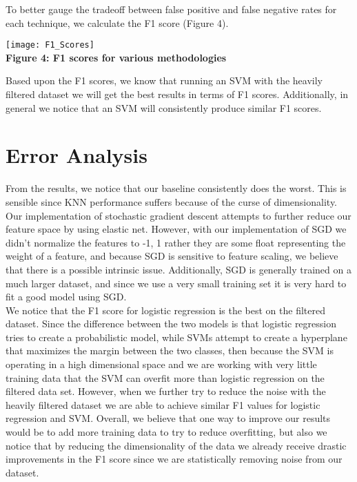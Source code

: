 \documentclass[12pt]{scrartcl}
\begin{document}
    To better gauge the tradeoff between false positive and false negative rates for each technique, we calculate the F1 score (Figure 4).
    
    \begin{center}
    \texttt{[image: F1\_Scores]}\\
    \textbf{Figure 4: F1 scores for various methodologies}
    \end{center}

    Based upon the F1 scores, we know that running an SVM with the heavily filtered dataset we will get the best results in terms of F1 scores. Additionally, in general we notice that an SVM will consistently produce similar F1 scores. 


    \section{Error Analysis}
    From the results, we notice that our baseline consistently does the worst. This is sensible since KNN performance suffers because of the curse of dimensionality. Our implementation of stochastic gradient descent attempts to further reduce our feature space by using elastic net. However, with our implementation of SGD we didn't normalize the features to -1, 1 rather they are some float representing the weight of a feature, and because SGD is sensitive to feature scaling, we believe that there is a possible intrinsic issue. Additionally, SGD is generally trained on a much larger dataset, and since we use a very small training set it is very hard to fit a good model using SGD. \\
    
    We notice that the F1 score for logistic regression is the best on the filtered dataset. Since the difference between the two models is that logistic regression tries to create a probabilistic model, while SVMs attempt to create a hyperplane that maximizes the margin between the two classes, then because the SVM is operating in a high dimensional space and we are working with very little training data that the SVM can overfit more than logistic regression on the filtered data set. However, when we further try to reduce the noise with the heavily filtered dataset we are able to achieve similar F1 values for logistic regression and SVM. Overall, we believe that one way to improve our results would be to add more training data to try to reduce overfitting, but also we notice that by reducing the dimensionality of the data we already receive drastic improvements in the F1 score since we are statistically removing noise from our dataset. 
    
\end{document}
